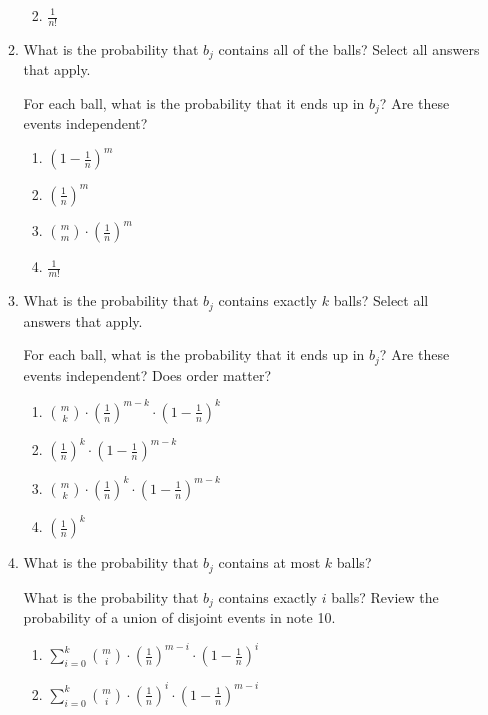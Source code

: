 \documentclass[11pt, preview]{standalone} %
\begin{document}
\begin{enumerate}
\begin{enumerate}
\begin{Multi}
\begin{enumerate}
\FalseChoice\item $\frac{1}{n!}$
\end{enumerate}
\end{Multi}
\item What is the probability that $b_j$ contains all of the balls? Select all answers that apply.
\begin{Multi}
For each ball, what is the probability that it ends up in $b_j$? Are these events independent?
\begin{enumerate}
\FalseChoice\item $\left(1-\frac{1}{n}\right)^m$
\TrueChoice\item $\left(\frac{1}{n}\right)^m$
\TrueChoice\item $\binom{m}{m}\cdot\left(\frac{1}{n}\right)^m$
\FalseChoice\item $\frac{1}{m!}$
\end{enumerate}
\end{Multi}
\item What is the probability that $b_j$ contains exactly $k$ balls? Select all answers that apply.
\begin{Multi}
For each ball, what is the probability that it ends up in $b_j$? Are these events independent? Does order matter?
\begin{enumerate}
\FalseChoice\item $\binom{m}{k}\cdot\left(\frac{1}{n}\right)^{m-k}\cdot \left(1-\frac{1}{n}\right)^{k}$
\FalseChoice\item $\left(\frac{1}{n}\right)^{k}\cdot \left(1-\frac{1}{n}\right)^{m-k}$
\TrueChoice\item $\binom{m}{k}\cdot\left(\frac{1}{n}\right)^{k}\cdot \left(1-\frac{1}{n}\right)^{m-k}$
\FalseChoice\item $\left(\frac{1}{n}\right)^{k}$
\end{enumerate}
\end{Multi}
\item What is the probability that $b_j$ contains at most $k$ balls?
\begin{Multi}
What is the probability that $b_j$ contains exactly $i$ balls? Review the probability of a union of disjoint events in note 10.
\begin{enumerate}
\FalseChoice\item $\sum_{i = 0}^{k}\binom{m}{i}\cdot\left(\frac{1}{n}\right)^{m-i}\cdot \left(1-\frac{1}{n}\right)^{i}$
\TrueChoice\item $\sum_{i = 0}^{k} \binom{m}{i}\cdot\left(\frac{1}{n}\right)^{i}\cdot \left(1-\frac{1}{n}\right)^{m-i}$

\end{enumerate}
\end{Multi}
\end{enumerate}
\end{enumerate}
\end{document}
